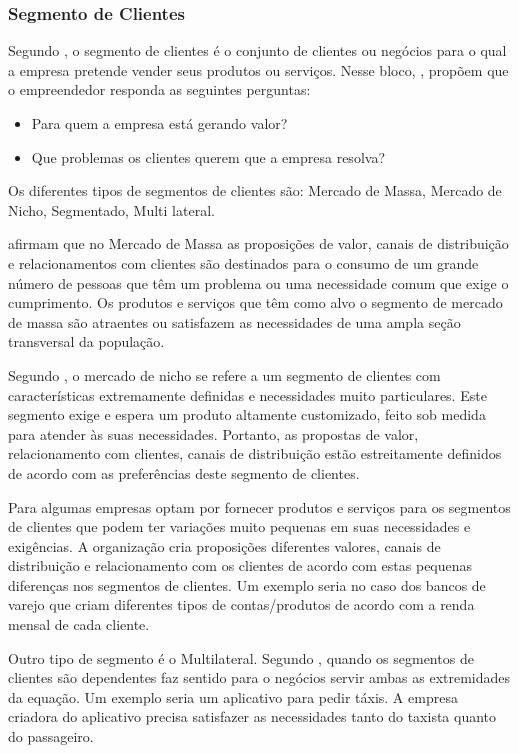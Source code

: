 \subsubsection{Segmento de Clientes}
\label{cha:segmento_de_clientes}
Segundo , o segmento de clientes é o conjunto de clientes ou negócios para o qual a empresa pretende vender seus produtos ou serviços.
Nesse bloco, , propõem que o empreendedor responda as seguintes perguntas:
\begin{itemize}
\item Para quem a empresa está gerando valor?
\item Que problemas os clientes querem que a empresa resolva?
\end{itemize}
Os diferentes tipos de segmentos de clientes são: Mercado de Massa, Mercado de Nicho, Segmentado, Multi lateral.

 afirmam que no Mercado de Massa as proposições de valor, canais de distribuição e relacionamentos com clientes são destinados para o consumo de um grande número de pessoas que têm um problema ou uma necessidade comum que exige o cumprimento. Os produtos e serviços que têm como alvo o segmento de mercado de massa são atraentes ou satisfazem as necessidades de uma ampla seção transversal da população.

Segundo , o mercado de nicho se refere a um segmento de clientes com características extremamente definidas e necessidades muito particulares. Este segmento exige e espera um produto altamente customizado, feito sob medida para atender às suas necessidades. Portanto, as propostas de valor, relacionamento com clientes, canais de distribuição estão estreitamente definidos de acordo com as preferências deste segmento de clientes.

Para  algumas empresas optam por fornecer produtos e serviços para os segmentos de clientes que podem ter variações muito pequenas em suas necessidades e exigências. A organização cria proposições diferentes valores, canais de distribuição e relacionamento com os clientes de acordo com estas pequenas diferenças nos segmentos de clientes. Um exemplo seria no caso dos bancos de varejo que criam diferentes tipos de contas/produtos de acordo com a renda mensal de cada cliente.

Outro tipo de segmento é o Multilateral. Segundo , quando os segmentos de clientes são dependentes faz sentido para o negócios servir ambas as extremidades da equação. Um exemplo seria um aplicativo para pedir táxis. A empresa criadora do aplicativo precisa satisfazer as necessidades tanto do taxista quanto do passageiro.

